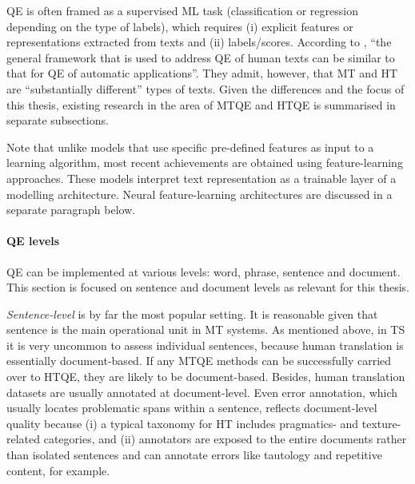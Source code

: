 QE is often framed as a supervised ML task (classification or regression depending on the type of labels), which requires (i) explicit features or representations extracted from texts and (ii) labels/scores. According to \citet[p.1]{Specia2018a}, ``the general framework that is used to address QE of human texts can be similar to that for QE of automatic applications''. They admit, however, that MT and HT are ``substantially different'' types of texts. Given the differences and the focus of this thesis, existing research in the area of MTQE and HTQE is summarised in separate subsections.

Note that unlike models that use specific pre-defined features as input to a learning algorithm, most recent achievements are obtained using feature-learning approaches. These models interpret text representation as a trainable layer of a modelling architecture. Neural feature-learning architectures are discussed in a separate paragraph below. 

\paragraph{QE levels} QE can be implemented at various levels: word, phrase, sentence and document. This section is focused on sentence and document levels as relevant for this thesis.

\textit{Sentence-level} is by far the most popular setting. It is reasonable given that sentence is the main operational unit in MT systems. As mentioned above, in TS it is very uncommon to assess individual sentences, because human translation is essentially document-based. If any MTQE methods can be successfully carried over to HTQE, they are likely to be document-based. Besides, human translation datasets are usually annotated at document-level. Even error annotation, which usually locates problematic spans within a sentence, reflects document-level quality because (i) a typical taxonomy for HT includes pragmatics- and texture-related categories, and (ii) annotators are exposed to the entire documents rather than isolated sentences and can annotate errors like tautology and repetitive content, for example. 

